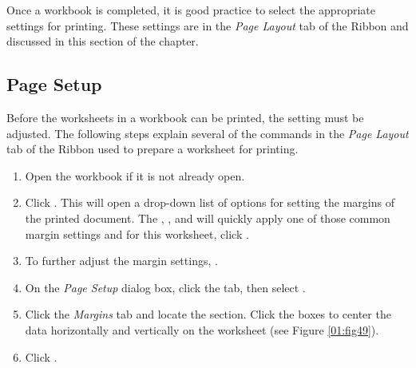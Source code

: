 Once a workbook is completed, it is good practice to select the appropriate settings for printing. These settings are in the \textit{Page Layout} tab of the Ribbon and discussed in this section of the chapter.

\subsection{Page Setup}

Before the worksheets in a workbook can be printed, the setting must be adjusted. The following steps explain several of the commands in the \textit{Page Layout} tab of the Ribbon used to prepare a worksheet for printing.

\begin{enumerate}
	\item Open the  workbook if it is not already open.
	\item Click . This will open a drop-down list of options for setting the margins of the printed document. The , , and  will quickly apply one of those common margin settings and for this worksheet, click .
	\item To further adjust the margin settings, .
	\item On the \textit{Page Setup} dialog box, click the  tab, then select .
	\item Click the \textit{Margins} tab and locate the  section. Click the boxes to center the data horizontally and vertically on the worksheet (see Figure \ref{01:fig49}).
	\item Click .
\end{enumerate}

